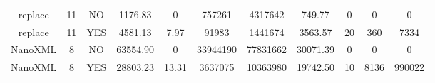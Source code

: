 \begin{table*}[]
\begin{tabular}{@{}ccccccccccc@{}}
        replace                                                  & 11                                                        & NO                                                                 & 1176.83                                                         & 0                                                                        & 757261                                                     & 4317642                                                       & 749.77                                                        & 0                                                           & 0                                                                    & 0                                                                    \\
        replace                                                  & 11                                                        & YES                                                                & 4581.13                                                         & 7.97                                                                     & 91983                                                      & 1441674                                                       & 3563.57                                                       & 20                                                          & 360                                                                  & 7334                                                                 \\ \midrule
        NanoXML                                                  & 8                                                         & NO                                                                 & 63554.90                                                        & 0                                                                        & 33944190                                                   & 77831662                                                      & 30071.39                                                      & 0                                                           & 0                                                                    & 0                                                                    \\
        NanoXML                                                  & 8                                                         & YES                                                                & 28803.23                                                        & 13.31                                                                    & 3637075                                                    & 10363980                                                      & 19742.50                                                      & 10                                                          & 8136                                                                 & 990022                                                               \\ \midrule

\end{tabular}
\end{table*}
